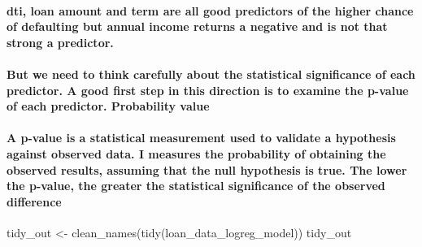 \documentclass[
]{article}
\newenvironment{Shaded}{\begin{snugshade}}{\end{snugshade}}
\newcommand{\FunctionTok}[1]{\textcolor[rgb]{0.00,0.00,0.00}{#1}}
\newcommand{\NormalTok}[1]{#1}
\newcommand{\OtherTok}[1]{\textcolor[rgb]{0.56,0.35,0.01}{#1}}
\begin{document}
\hypertarget{dti-loan-amount-and-term-are-all-good-predictors-of-the-higher-chance-of-defaulting-but-annual-income-returns-a-negative-and-is-not-that-strong-a-predictor.}{%
\paragraph{dti, loan amount and term are all good predictors of the
higher chance of defaulting but annual income returns a negative and is
not that strong a
predictor.}\label{dti-loan-amount-and-term-are-all-good-predictors-of-the-higher-chance-of-defaulting-but-annual-income-returns-a-negative-and-is-not-that-strong-a-predictor.}}

\hypertarget{but-we-need-to-think-carefully-about-the-statistical-significance-of-each-predictor.-a-good-first-step-in-this-direction-is-to-examine-the-p-value-of-each-predictor.-probability-value}{%
\paragraph{But we need to think carefully about the statistical
significance of each predictor. A good first step in this direction is
to examine the p-value of each predictor. Probability
value}\label{but-we-need-to-think-carefully-about-the-statistical-significance-of-each-predictor.-a-good-first-step-in-this-direction-is-to-examine-the-p-value-of-each-predictor.-probability-value}}

\hypertarget{a-p-value-is-a-statistical-measurement-used-to-validate-a-hypothesis-against-observed-data.-i-measures-the-probability-of-obtaining-the-observed-results-assuming-that-the-null-hypothesis-is-true.-the-lower-the-p-value-the-greater-the-statistical-significance-of-the-observed-difference}{%
\paragraph{A p-value is a statistical measurement used to validate a
hypothesis against observed data. I measures the probability of
obtaining the observed results, assuming that the null hypothesis is
true. The lower the p-value, the greater the statistical significance of
the observed
difference}\label{a-p-value-is-a-statistical-measurement-used-to-validate-a-hypothesis-against-observed-data.-i-measures-the-probability-of-obtaining-the-observed-results-assuming-that-the-null-hypothesis-is-true.-the-lower-the-p-value-the-greater-the-statistical-significance-of-the-observed-difference}}

\begin{Shaded}
\begin{Highlighting}[]
\NormalTok{tidy\_out }\OtherTok{\textless{}{-}} \FunctionTok{clean\_names}\NormalTok{(}\FunctionTok{tidy}\NormalTok{(loan\_data\_logreg\_model))}
\NormalTok{tidy\_out}
\end{Highlighting}
\end{Shaded}
\end{document}
